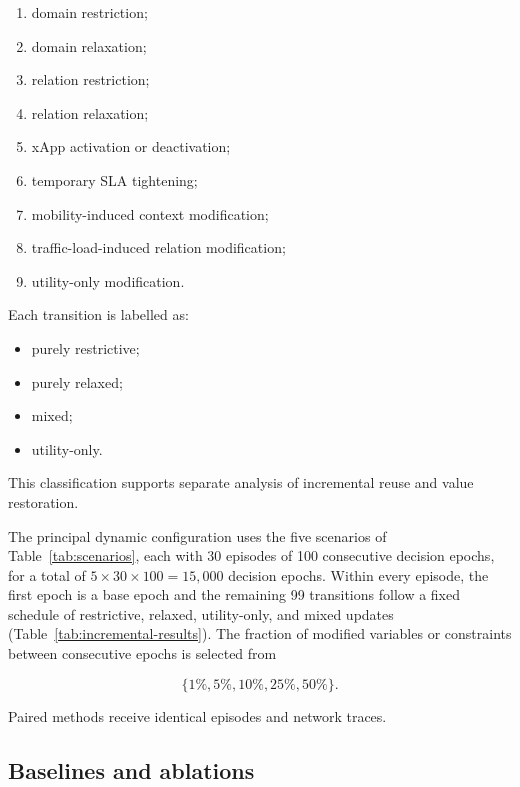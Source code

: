 \documentclass[pdflatex,sn-mathphys-num,iicol,oneside]{sn-jnl}
\begin{document}
\begin{enumerate}
    \item domain restriction;
    \item domain relaxation;
    \item relation restriction;
    \item relation relaxation;
    \item xApp activation or deactivation;
    \item temporary SLA tightening;
    \item mobility-induced context modification;
    \item traffic-load-induced relation modification;
    \item utility-only modification.
\end{enumerate}

Each transition is labelled as:

\begin{itemize}
    \item purely restrictive;
    \item purely relaxed;
    \item mixed;
    \item utility-only.
\end{itemize}

This classification supports separate analysis of incremental reuse
and value restoration.

The principal dynamic configuration uses the five scenarios of
Table~\ref{tab:scenarios}, each with 30 episodes of 100 consecutive
decision epochs, for a total of $5\times30\times100=15{,}000$ decision
epochs. Within every episode, the first epoch is a base epoch and the
remaining 99 transitions follow a fixed schedule of restrictive,
relaxed, utility-only, and mixed updates (Table~\ref{tab:incremental-results}).
The fraction of modified variables or constraints between consecutive
epochs is selected from

\begin{equation}
\{1\%,5\%,10\%,25\%,50\%\}.
\end{equation}

Paired methods receive identical episodes and network traces.

\subsection{Baselines and ablations}
\end{document}
